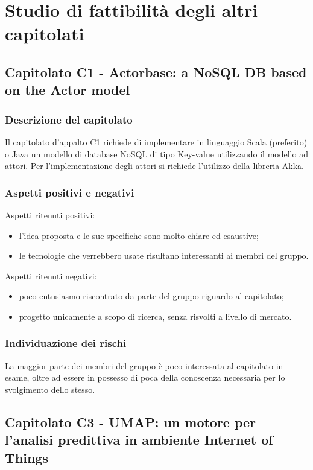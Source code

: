 \documentclass[../StudioDiFattibilita.tex]{subfiles}
\begin{document}
\section{Studio di fattibilità degli altri capitolati}
	\subsection{Capitolato C1 - Actorbase: a NoSQL DB based on the Actor model}
		\subsubsection{Descrizione del capitolato}
		Il capitolato d'appalto C1 richiede di implementare in linguaggio Scala (preferito) o Java un modello di database NoSQL di tipo Key-value utilizzando il modello ad attori. Per l'implementazione degli attori si richiede l'utilizzo della libreria Akka.
		\subsubsection{Aspetti positivi e negativi}
		Aspetti ritenuti positivi:
			\begin{itemize}
				\item l'idea proposta e le sue specifiche sono molto chiare ed esaustive;
				\item le tecnologie che verrebbero usate risultano interessanti ai membri del gruppo.
			\end{itemize}
		Aspetti ritenuti negativi:
			\begin{itemize}
				\item poco entusiasmo riscontrato da parte del gruppo riguardo al capitolato;
				\item progetto unicamente a scopo di ricerca, senza risvolti a livello di mercato.
			\end{itemize}
		\subsubsection{Individuazione dei rischi}
		La maggior parte dei membri del gruppo è poco interessata al capitolato in esame, oltre ad essere in possesso di poca della conoscenza necessaria per lo svolgimento dello stesso.		
	\subsection{Capitolato C3 - UMAP: un motore per l'analisi predittiva in ambiente Internet of Things}
\end{document}

